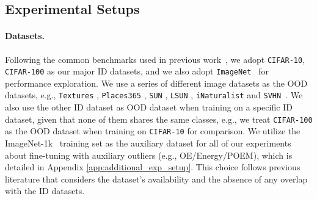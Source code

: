 \documentclass{article}
\theoremstyle{plain}
\theoremstyle{definition}
\theoremstyle{remark}
\begin{document}
\begin{table*}[t!]
{\begin{tabular}{c|l|cccccc}
        \bottomrule[1.5pt]
    \end{tabular}}
    \label{tab:my_label2}
\end{table*}

\subsection{Experimental Setups}
\label{sec:exp_part1}

\paragraph{Datasets.} Following the common benchmarks used in previous work~\citep{liu2020energy,ming2022poem}, we adopt \verb+CIFAR-10+, \verb+CIFAR-100+ \citep{krizhevsky2009learning_cifar10} as our major ID datasets, and we also adopt \texttt{ImageNet}~\citep{deng2009imagenet} for performance exploration. We use a series of different image datasets as the OOD datasets, e.g., \verb+Textures+ \citep{cimpoi2014describing}, \verb+Places365+ \citep{zhou2017places}, \verb+SUN+ \citep{5539970}, \verb+LSUN+ \citep{yu2015lsun}, \verb+iNaturalist+ \citep{van2018inaturalist} and \texttt{SVHN}~\citep{netzer2011reading_SVHN}. We also use the other ID dataset as OOD dataset when training on a specific ID dataset, given that none of them shares the same classes, e.g., we treat \verb+CIFAR-100+ as the OOD dataset when training on \verb+CIFAR-10+ for comparison. We utilize the ImageNet-1k~\citep{deng2009imagenet} training set as the auxiliary dataset for all of our experiments about fine-tuning with auxiliary outliers (e.g., OE/Energy/POEM), which is detailed in Appendix \ref{app:additional_exp_setup}. This choice follows previous literature \citep{hendrycks2018deep,liu2020energy,ming2022poem} that considers the dataset's availability and the absence of any overlap with the ID datasets.
\end{document}
